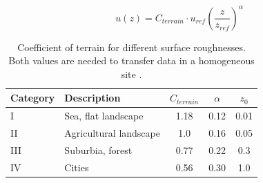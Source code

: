 \begin{equation}
u(z)=C_{terrain} \cdot u_{ref}\left( \frac{z}{z_{ref}}\right )^\alpha
\end{equation}



\begin{table}[hbt]
	\small
	\centering
	\captionsetup{format=plain}
	\caption[Coefficient of terrain for different surface roughnesses]{Coefficient of terrain for different surface roughnesses. Both values are needed to transfer data in a homogeneous site \citep{DIN10554-2005}.}
	\label{tab:boundary_layer_roughness_alpha}
	\begin{tabular}{llSSS}
		\toprule
		Category&  	Description									& {$C_{terrain}$}   & {$\alpha$} 		& {$z_0$} \\
		\midrule
		I 	&	Sea, flat landscape             			& 1.18 				& 0.12     			& 0.01  \\ 
		II 	&	Agricultural landscape         				& 1.0  				& 0.16     			& 0.05  \\ 
		III &	Suburbia, forest              				& 0.77 				& 0.22     			& 0.3   \\ 
		IV 	&	Cities 										& 0.56 				& 0.30    			& 1.0   \\
		\bottomrule
	\end{tabular}
\end{table}

